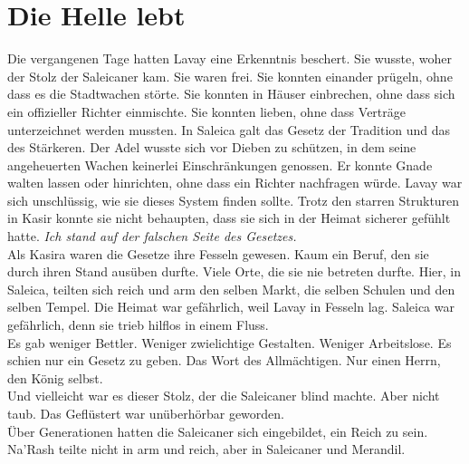 \chapter{Die Helle lebt}

Die vergangenen Tage hatten Lavay eine Erkenntnis beschert. Sie wusste, woher der Stolz der 
Saleicaner kam. Sie waren frei. Sie konnten einander prügeln, ohne dass es die Stadtwachen störte. 
Sie konnten in Häuser einbrechen, ohne dass sich ein offizieller Richter einmischte. Sie konnten 
lieben, ohne dass Verträge unterzeichnet werden mussten. In Saleica galt das Gesetz der Tradition 
und das des Stärkeren. Der Adel wusste sich vor Dieben zu schützen, in dem seine angeheuerten 
Wachen keinerlei Einschränkungen genossen. Er konnte Gnade walten lassen oder hinrichten, ohne dass 
ein Richter nachfragen würde. Lavay war sich unschlüssig, wie sie dieses System finden sollte. 
Trotz den starren Strukturen in Kasir konnte sie nicht behaupten, dass sie sich in der Heimat 
sicherer gefühlt hatte. \textit{Ich stand auf der falschen Seite des Gesetzes.}\\
Als Kasira waren die Gesetze ihre Fesseln gewesen. Kaum ein Beruf, den sie durch ihren Stand 
ausüben durfte. Viele Orte, die sie nie betreten durfte. Hier, in Saleica, teilten sich reich und 
arm den selben Markt, die selben Schulen und den selben Tempel. Die Heimat war gefährlich, weil 
Lavay in Fesseln lag. Saleica war gefährlich, denn sie trieb hilflos in einem Fluss.\\
Es gab weniger Bettler. Weniger zwielichtige Gestalten. Weniger Arbeitslose. Es schien nur ein 
Gesetz zu geben. Das Wort des Allmächtigen. Nur einen Herrn, den König selbst.\\
Und vielleicht war es dieser Stolz, der die Saleicaner blind machte. Aber nicht taub. Das 
Geflüstert war unüberhörbar geworden.\\
Über Generationen hatten die Saleicaner sich eingebildet, ein Reich zu sein. Na'Rash teilte nicht 
in arm und reich, aber in Saleicaner und Merandil. 